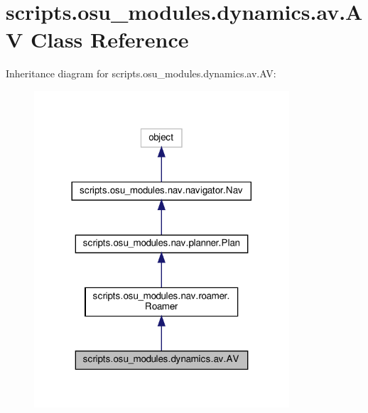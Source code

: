 \hypertarget{classscripts_1_1osu__modules_1_1dynamics_1_1av_1_1AV}{}\section{scripts.\+osu\+\_\+modules.\+dynamics.\+av.\+AV Class Reference}
\label{classscripts_1_1osu__modules_1_1dynamics_1_1av_1_1AV}


Inheritance diagram for scripts.\+osu\+\_\+modules.\+dynamics.\+av.\+AV\+:
\nopagebreak
\begin{figure}[H]
\begin{center}
\leavevmode
\includegraphics[width=269pt]{d4/d15/classscripts_1_1osu__modules_1_1dynamics_1_1av_1_1AV__inherit__graph}
\end{center}
\end{figure}


